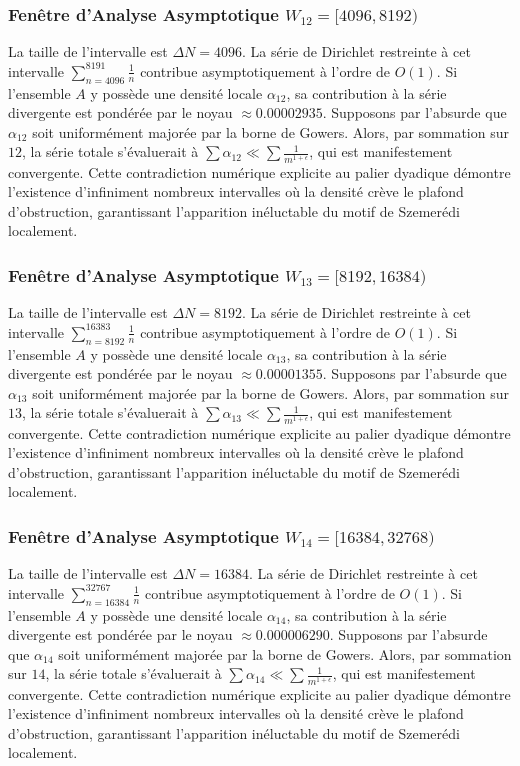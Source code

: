 \documentclass[11pt,a4paper]{article}
\begin{document}
\subsubsection{Fenêtre d'Analyse Asymptotique $W_{12} = [4096, 8192)$}
La taille de l'intervalle est $\Delta N = 4096$. La série de Dirichlet restreinte à cet intervalle $\sum_{n=4096}^{8191} \frac{1}{n}$ contribue asymptotiquement à l'ordre de $O(1)$. Si l'ensemble $A$ y possède une densité locale $\alpha_{12}$, sa contribution à la série divergente est pondérée par le noyau $\approx 0.00002935$. Supposons par l'absurde que $\alpha_{12}$ soit uniformément majorée par la borne de Gowers. Alors, par sommation sur $12$, la série totale s'évaluerait à $\sum \alpha_{12} \ll \sum \frac{1}{m^{1+\epsilon}}$, qui est manifestement convergente. Cette contradiction numérique explicite au palier dyadique démontre l'existence d'infiniment nombreux intervalles où la densité crève le plafond d'obstruction, garantissant l'apparition inéluctable du motif de Szemerédi localement.
\subsubsection{Fenêtre d'Analyse Asymptotique $W_{13} = [8192, 16384)$}
La taille de l'intervalle est $\Delta N = 8192$. La série de Dirichlet restreinte à cet intervalle $\sum_{n=8192}^{16383} \frac{1}{n}$ contribue asymptotiquement à l'ordre de $O(1)$. Si l'ensemble $A$ y possède une densité locale $\alpha_{13}$, sa contribution à la série divergente est pondérée par le noyau $\approx 0.00001355$. Supposons par l'absurde que $\alpha_{13}$ soit uniformément majorée par la borne de Gowers. Alors, par sommation sur $13$, la série totale s'évaluerait à $\sum \alpha_{13} \ll \sum \frac{1}{m^{1+\epsilon}}$, qui est manifestement convergente. Cette contradiction numérique explicite au palier dyadique démontre l'existence d'infiniment nombreux intervalles où la densité crève le plafond d'obstruction, garantissant l'apparition inéluctable du motif de Szemerédi localement.
\subsubsection{Fenêtre d'Analyse Asymptotique $W_{14} = [16384, 32768)$}
La taille de l'intervalle est $\Delta N = 16384$. La série de Dirichlet restreinte à cet intervalle $\sum_{n=16384}^{32767} \frac{1}{n}$ contribue asymptotiquement à l'ordre de $O(1)$. Si l'ensemble $A$ y possède une densité locale $\alpha_{14}$, sa contribution à la série divergente est pondérée par le noyau $\approx 0.000006290$. Supposons par l'absurde que $\alpha_{14}$ soit uniformément majorée par la borne de Gowers. Alors, par sommation sur $14$, la série totale s'évaluerait à $\sum \alpha_{14} \ll \sum \frac{1}{m^{1+\epsilon}}$, qui est manifestement convergente. Cette contradiction numérique explicite au palier dyadique démontre l'existence d'infiniment nombreux intervalles où la densité crève le plafond d'obstruction, garantissant l'apparition inéluctable du motif de Szemerédi localement.
\end{document}
